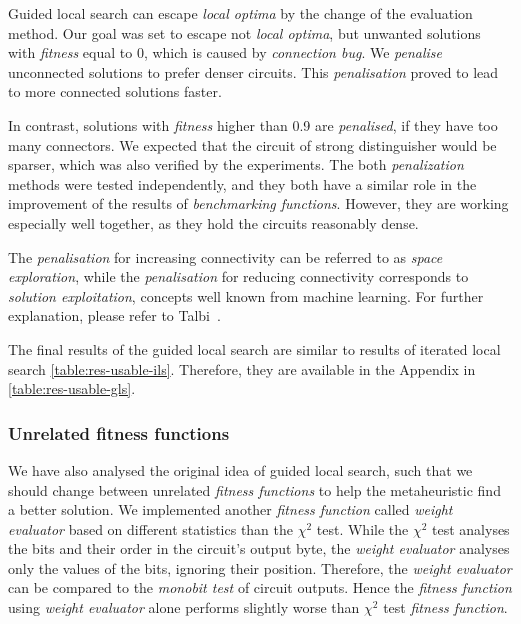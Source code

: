 \documentclass[
    digital,    %
    oneside,    %
    color,
    11pt,
    nocover,
    notable,
    nolof,
    nolot,
]{fithesis3}
\begin{document}
Guided local search can escape \textit{local optima} by the change of the evaluation method. Our goal was set to escape not \textit{local optima}, but unwanted solutions with \textit{fitness} equal to 0, which is caused by \textit{connection bug}. We \textit{penalise} unconnected solutions to prefer denser circuits. This \textit{penalisation} proved to lead to more connected solutions faster.

In contrast, solutions with \textit{fitness} higher than 0.9 are \textit{penalised}, if they have too many connectors. We expected that the circuit of strong distinguisher would be sparser, which was also verified by the experiments. The both \textit{penalization} methods were tested independently, and they both have a similar role in the improvement of the results of \textit{benchmarking functions}. However, they are working especially well together, as they hold the circuits reasonably dense.

The \textit{penalisation} for increasing connectivity can be referred to as \textit{space exploration}, while the \textit{penalisation} for reducing connectivity corresponds to \textit{solution exploitation}, concepts well known from machine learning. For further explanation, please refer to Talbi~\cite[Section 1.3.3, page 24]{talbi2009metaheuristics}.

The final results of the guided local search are similar to results of iterated local search \cref{table:res-usable-ils}. Therefore, they are available in the Appendix in \cref{table:res-usable-gls}.

\subsubsection{\textbf{Unrelated fitness functions}}

We have also analysed the original idea of guided local search, such that we should change between unrelated \textit{fitness functions} to help the metaheuristic find a better solution. We implemented another \textit{fitness function} called \textit{weight evaluator} based on different statistics than the $\chi^{2}$ test. While the $\chi^{2}$ test analyses the bits and their order in the circuit's output byte, the \textit{weight evaluator} analyses only the values of the bits, ignoring their position. Therefore, the \textit{weight evaluator} can be compared to the \textit{monobit test} of circuit outputs. Hence the \textit{fitness function} using \textit{weight evaluator} alone performs slightly worse than $\chi^{2}$ test \textit{fitness function}.
\end{document}
